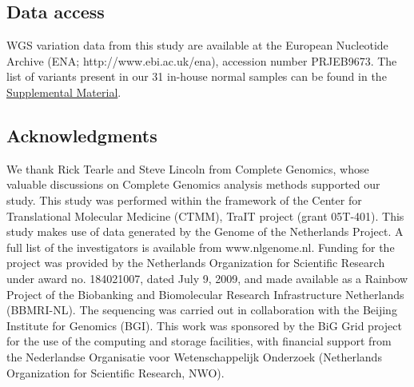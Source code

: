 \subsection*{Data access}

WGS variation data from this study are available at the European Nucleotide Archive (ENA; http://www.ebi.ac.uk/ena), accession number PRJEB9673. The list of variants present in our 31 in-house normal samples can be found in the \href{https://genome.cshlp.org/content/25/9/1382/suppl/DC1}{Supplemental Material}.

\subsection*{Acknowledgments}

We thank Rick Tearle and Steve Lincoln from Complete Genomics, whose valuable discussions on Complete Genomics analysis methods supported our study. This study was performed within the framework of the Center for Translational Molecular Medicine (CTMM), TraIT project (grant 05T-401). This study makes use of data generated by the Genome of the Netherlands Project. A full list of the investigators is available from www.nlgenome.nl. Funding for the project was provided by the Netherlands Organization for Scientific Research under award no. 184021007, dated July 9, 2009, and made available as a Rainbow Project of the Biobanking and Biomolecular Research Infrastructure Netherlands (BBMRI-NL). The sequencing was carried out in collaboration with the Beijing Institute for Genomics (BGI). This work was sponsored by the BiG Grid project for the use of the computing and storage facilities, with financial support from the Nederlandse Organisatie voor Wetenschappelijk Onderzoek (Netherlands Organization for Scientific Research, NWO).




